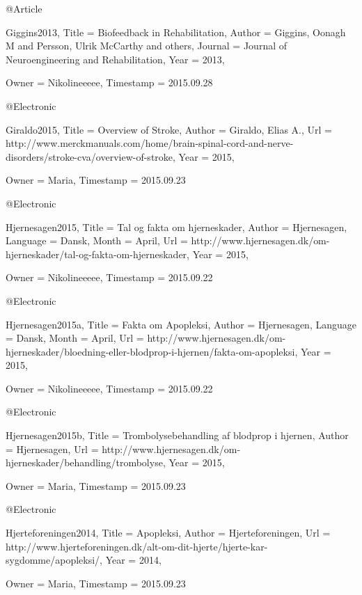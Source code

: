 @Article{Giggins2013,
  Title                    = {Biofeedback in Rehabilitation},
  Author                   = {Giggins, Oonagh M and Persson, Ulrik McCarthy and others},
  Journal                  = {Journal of Neuroengineering and Rehabilitation},
  Year                     = {2013},

  Owner                    = {Nikolineeeee},
  Timestamp                = {2015.09.28}
}

@Electronic{Giraldo2015,
  Title                    = {Overview of Stroke},
  Author                   = {Giraldo, Elias A.},
  Url                      = {http://www.merckmanuals.com/home/brain-spinal-cord-and-nerve-disorders/stroke-cva/overview-of-stroke},
  Year                     = {2015},

  Owner                    = {Maria},
  Timestamp                = {2015.09.23}
}

@Electronic{Hjernesagen2015,
  Title                    = {Tal og fakta om hjerneskader},
  Author                   = {Hjernesagen},
  Language                 = {Dansk},
  Month                    = {April},
  Url                      = {http://www.hjernesagen.dk/om-hjerneskader/tal-og-fakta-om-hjerneskader},
  Year                     = {2015},

  Owner                    = {Nikolineeeee},
  Timestamp                = {2015.09.22}
}

@Electronic{Hjernesagen2015a,
  Title                    = {Fakta om Apopleksi},
  Author                   = {Hjernesagen},
  Language                 = {Dansk},
  Month                    = {April},
  Url                      = {http://www.hjernesagen.dk/om-hjerneskader/bloedning-eller-blodprop-i-hjernen/fakta-om-apopleksi},
  Year                     = {2015},

  Owner                    = {Nikolineeeee},
  Timestamp                = {2015.09.22}
}

@Electronic{Hjernesagen2015b,
  Title                    = {Trombolysebehandling af blodprop i hjernen},
  Author                   = {Hjernesagen},
  Url                      = {http://www.hjernesagen.dk/om-hjerneskader/behandling/trombolyse},
  Year                     = {2015},

  Owner                    = {Maria},
  Timestamp                = {2015.09.23}
}

@Electronic{Hjerteforeningen2014,
  Title                    = {Apopleksi},
  Author                   = {Hjerteforeningen},
  Url                      = {http://www.hjerteforeningen.dk/alt-om-dit-hjerte/hjerte-kar-sygdomme/apopleksi/},
  Year                     = {2014},

  Owner                    = {Maria},
  Timestamp                = {2015.09.23}
}

